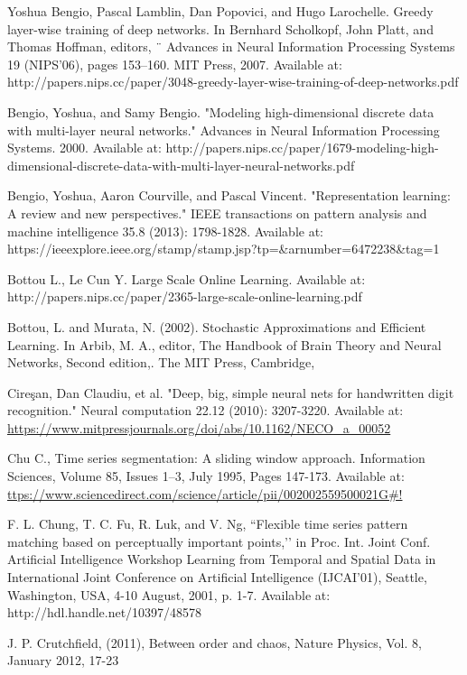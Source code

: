 \documentclass[a4paper,11pt,oneside]{article}
\theoremstyle{plain}
\theoremstyle{definition}
\begin{document}
\begin{thebibliography}{bibliography}
Yoshua Bengio, Pascal Lamblin, Dan Popovici, and Hugo Larochelle. Greedy layer-wise training of deep networks. In Bernhard Scholkopf, John Platt, and Thomas Hoffman, editors, ¨ Advances in Neural Information Processing Systems 19 (NIPS’06), pages 153–160. MIT Press, 
2007. Available at: http://papers.nips.cc/paper/3048-greedy-layer-wise-training-of-deep-networks.pdf

Bengio, Yoshua, and Samy Bengio. "Modeling high-dimensional discrete data with multi-layer neural networks." Advances in Neural Information Processing Systems. 2000.
Available at: http://papers.nips.cc/paper/1679-modeling-high-dimensional-discrete-data-with-multi-layer-neural-networks.pdf

Bengio, Yoshua, Aaron Courville, and Pascal Vincent. "Representation learning: A review and new perspectives." IEEE transactions on pattern analysis and machine intelligence 35.8 (2013): 1798-1828.
Available at: https://ieeexplore.ieee.org/stamp/stamp.jsp?tp=\&arnumber=6472238\&tag=1

Bottou L., Le Cun Y. Large Scale Online Learning. Available at: http://papers.nips.cc/paper/2365-large-scale-online-learning.pdf

Bottou, L. and Murata, N. (2002). Stochastic Approximations and Efficient Learning. In Arbib, M. A., editor, The Handbook of Brain Theory and Neural Networks, Second edition,. The MIT Press, Cambridge, 

Cireşan, Dan Claudiu, et al. "Deep, big, simple neural nets for handwritten digit recognition." Neural computation 22.12 (2010): 3207-3220.
Available at: \url{https://www.mitpressjournals.org/doi/abs/10.1162/NECO_a_00052}

Chu C., Time series segmentation: A sliding window approach. Information Sciences, Volume 85, Issues 1–3, July 1995, Pages 
147-173. Available at: \url{ttps://www.sciencedirect.com/science/article/pii/002002559500021G#!}

 F. L. Chung, T. C. Fu, R. Luk, and V. Ng, “Flexible time series pattern matching based on perceptually important points,’’ in Proc. Int. Joint Conf. Artificial Intelligence Workshop  
 Learning from Temporal and Spatial Data in International Joint Conference on Artificial Intelligence (IJCAI'01), Seattle, Washington, USA, 4-10 August, 2001, p. 
 1-7. Available at: http://hdl.handle.net/10397/48578

J. P. Crutchfield, (2011), Between order and chaos, Nature Physics, Vol. 8, January 2012, 17-23


\end{thebibliography}
\end{document}
